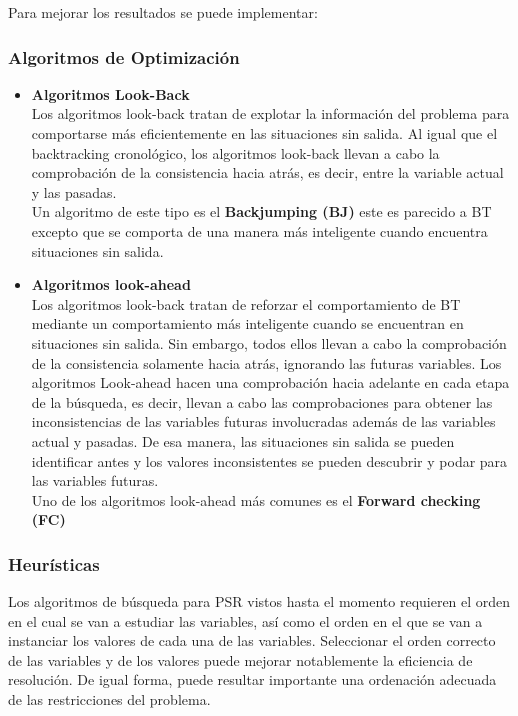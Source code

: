 \documentclass[a4paper]{article}
\begin{document}
Para mejorar los resultados se puede implementar:
\subsubsection{Algoritmos de Optimización}
\begin{itemize}
\item \textbf{Algoritmos Look-Back}\\
Los algoritmos look-back tratan de explotar la información del problema para comportarse más eficientemente en las situaciones sin salida. Al igual que el backtracking cronológico, los algoritmos look-back llevan a cabo la comprobación de la consistencia hacia atrás, es decir, entre la variable actual y las pasadas.\\
Un algoritmo de este tipo es el \textbf{Backjumping (BJ)} este es parecido a BT excepto que se comporta de una manera más inteligente cuando encuentra situaciones sin salida.

\item \textbf{Algoritmos look-ahead}\\
Los algoritmos look-back tratan de reforzar el comportamiento de BT mediante un comportamiento más inteligente cuando se encuentran en situaciones sin salida. Sin embargo, todos ellos llevan a cabo la comprobación de la consistencia solamente hacia atrás, ignorando las futuras variables. Los algoritmos Look-ahead hacen una comprobación hacia adelante en cada etapa de la búsqueda, es decir, llevan a cabo las comprobaciones para obtener las inconsistencias de las variables futuras involucradas además de las variables actual y pasadas. De esa manera, las situaciones sin salida se pueden identificar antes y los valores inconsistentes se pueden descubrir y podar para las variables futuras.\\
Uno de los algoritmos look-ahead más comunes es el \textbf{Forward checking (FC)} 

\end{itemize}

\subsubsection{Heurísticas}
Los algoritmos de búsqueda para PSR vistos hasta el momento requieren el orden en el cual se van a estudiar las variables, así como el orden en el que se van a instanciar los valores de cada una de las variables. Seleccionar el orden correcto de las variables y de los valores puede mejorar notablemente la eficiencia de resolución. De igual forma, puede resultar importante una ordenación adecuada de las restricciones del problema.
\end{document}
